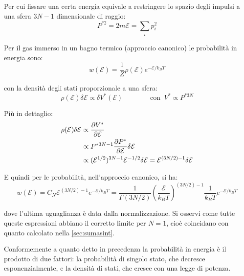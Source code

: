 Per cui fissare una certa energia equivale a restringere lo spazio degli impulsi a una sfera $3N-1$ dimensionale di raggio:
\begin{equation*}
	P^{\ast 2} = 2m \mathcal{E} = \sum_{i} p_i^2
\end{equation*}

Per il gas immerso in un bagno termico (approccio canonico) le probabilità in energia sono:
\begin{equation*}
	w(\mathcal{E}) = \frac{1}{Z} \rho(\mathcal{E}) e^{- \mathcal{E}/k_B T}
\end{equation*}

\noindent con la densità degli stati proporzionale a una sfera:
\begin{equation*}
\rho(\mathcal{E}) \delta \mathcal{E} \propto \delta V^\ast(\mathcal{E}) \qquad \qquad \text{con }~ V^\ast \propto P^{\ast{3N}}
\end{equation*}

\noindent Più in dettaglio:
\begin{align*}
\rho(\mathcal{E}) \delta \mathcal{E} &\propto \frac{\partial {V^\ast}}{\partial {\mathcal{E}}}\\
&\propto P^{\ast{3N-1}} \frac{\partial {P^\ast}}{\partial {\mathcal{E}}} \delta \mathcal{E}\\
&\propto (\mathcal{E}^{1/2})^{3N-1}\mathcal{E}^{-1/2} \delta \mathcal{E} = \mathcal{E}^{(3N/2) - 1}\delta \mathcal{E}
\end{align*}

E quindi per le probabilità, nell'approccio canonico, si ha:
\begin{equation*}
w(\mathcal{E}) = C_N \mathcal{E}^{(3N/2)-1}e^{-\mathcal{E}/k_B T} = \frac{1}{\Gamma(3N/2)}\left(\frac{\mathcal{E}}{k_B T}\right)^{(3N/2)-1}\frac{1}{k_B T} e ^{- \mathcal{E}/k_B T}
\end{equation*}

\noindent dove l'ultima uguaglianza è data dalla normalizzazione. Si osservi come tutte queste espressioni abbiano il corretto limite per $N = 1$, cioè coincidano con quanto calcolato nella \cref{sec:sumasint}.

Conformemente a quanto detto in precedenza la probabilità in energia è il prodotto di due fattori: la probabilità di singolo stato, che decresce esponenzialmente, e la densità di stati, che cresce con una legge di potenza.

